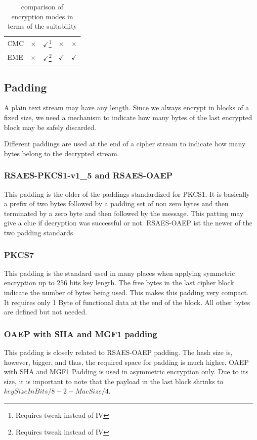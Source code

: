\begin{table}[ht]
\begin{tabular}{|l|l|l|l|l|}
		CMC                                                         & $\times$        & $\checkmark$\footnote{Requires tweak instead of IV}& $\times$                    & $\times$\\           
		EME                                                         & $\times$        & $\checkmark$\footnote{Requires tweak instead of IV}& $\checkmark$                    & $\checkmark$\\              
		\hline          
	\end{tabular}    
	\caption{comparison of encryption modes in terms of the suitability}
	\label{tab:ModeSuitCrit}
\end{table}

\subsection{Padding}
A plain text stream may have any length. Since we always encrypt in blocks of a fixed size, we need a mechanism to indicate how many bytes of the last encrypted block may be safely discarded. 

Different paddings are used at the end of a cipher stream to indicate how many bytes belong to the decrypted stream.

\subsubsection{RSAES-PKCS1-v1\_5 and RSAES-OAEP}
This padding is the older of the paddings standardized for PKCS1. It is basically a prefix of two bytes followed by a padding set of non zero bytes and then terminated by a zero byte and then followed by the message. This patting may give a clue if decryption was successful or not. RSAES-OAEP ist the newer of the two padding standards 

\subsubsection{PKCS7} 
This padding is the standard used in many places when applying symmetric encryption up to 256 bits key length. The free bytes in the last cipher block indicate the number of bytes being used. This makes this padding very compact. It requires only 1 Byte of functional data at the end of the block. All other bytes are defined but not needed.

\subsubsection{OAEP with SHA and MGF1 padding} 
This padding is closely related to RSAES-OAEP padding. The hash size is, however, bigger, and thus, the required space for padding is much higher. OAEP with SHA and MGF1 Padding is used in asymmetric encryption only. Due to its size, it is important to note that the payload in the last block shrinks to $keySizeInBits/8-2-MacSize/4$.

